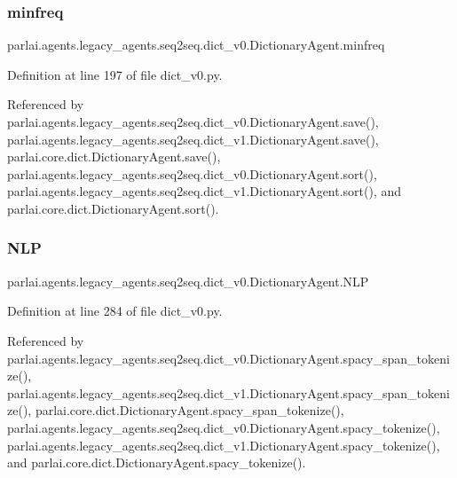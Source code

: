 \subsubsection{\texorpdfstring{minfreq}{minfreq}}
{\footnotesize\ttfamily parlai.\+agents.\+legacy\+\_\+agents.\+seq2seq.\+dict\+\_\+v0.\+Dictionary\+Agent.\+minfreq}



Definition at line 197 of file dict\+\_\+v0.\+py.



Referenced by parlai.\+agents.\+legacy\+\_\+agents.\+seq2seq.\+dict\+\_\+v0.\+Dictionary\+Agent.\+save(), parlai.\+agents.\+legacy\+\_\+agents.\+seq2seq.\+dict\+\_\+v1.\+Dictionary\+Agent.\+save(), parlai.\+core.\+dict.\+Dictionary\+Agent.\+save(), parlai.\+agents.\+legacy\+\_\+agents.\+seq2seq.\+dict\+\_\+v0.\+Dictionary\+Agent.\+sort(), parlai.\+agents.\+legacy\+\_\+agents.\+seq2seq.\+dict\+\_\+v1.\+Dictionary\+Agent.\+sort(), and parlai.\+core.\+dict.\+Dictionary\+Agent.\+sort().

\mbox{\label{classparlai_1_1agents_1_1legacy__agents_1_1seq2seq_1_1dict__v0_1_1DictionaryAgent_a232586a507c4b75732e9964264af2891}} 
\subsubsection{\texorpdfstring{N\+LP}{NLP}}
{\footnotesize\ttfamily parlai.\+agents.\+legacy\+\_\+agents.\+seq2seq.\+dict\+\_\+v0.\+Dictionary\+Agent.\+N\+LP}



Definition at line 284 of file dict\+\_\+v0.\+py.



Referenced by parlai.\+agents.\+legacy\+\_\+agents.\+seq2seq.\+dict\+\_\+v0.\+Dictionary\+Agent.\+spacy\+\_\+span\+\_\+tokenize(), parlai.\+agents.\+legacy\+\_\+agents.\+seq2seq.\+dict\+\_\+v1.\+Dictionary\+Agent.\+spacy\+\_\+span\+\_\+tokenize(), parlai.\+core.\+dict.\+Dictionary\+Agent.\+spacy\+\_\+span\+\_\+tokenize(), parlai.\+agents.\+legacy\+\_\+agents.\+seq2seq.\+dict\+\_\+v0.\+Dictionary\+Agent.\+spacy\+\_\+tokenize(), parlai.\+agents.\+legacy\+\_\+agents.\+seq2seq.\+dict\+\_\+v1.\+Dictionary\+Agent.\+spacy\+\_\+tokenize(), and parlai.\+core.\+dict.\+Dictionary\+Agent.\+spacy\+\_\+tokenize().

